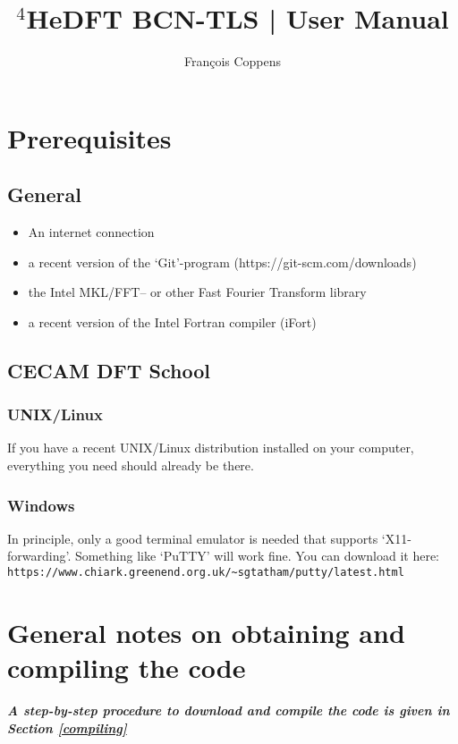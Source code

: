 \documentclass[10pt,a4paper]{article}
\author{Fran\c{c}ois Coppens}
\title{$^4$HeDFT BCN-TLS | User Manual }
\begin{document}
	\maketitle
	\tableofcontents
	\newpage
	\section{Prerequisites}
	\subsection{General}
	\begin{itemize}
		\item An internet connection
		\item a recent version of the `Git'-program (https://git-scm.com/downloads)
		\item the Intel MKL/FFT-- or other Fast Fourier Transform library
		\item a recent version of the Intel Fortran compiler (iFort)
	\end{itemize}

	\subsection{CECAM DFT School}
	\subsubsection{UNIX/Linux}
		If you have a recent UNIX/Linux distribution installed on your computer, everything you need should already be there.
	\subsubsection{Windows}
		In principle, only a good terminal emulator is needed that supports `X11-forwarding'. Something like `PuTTY' will work fine. You can download it here: {\color{lightblue}\verb|https://www.chiark.greenend.org.uk/~sgtatham/putty/latest.html|}

	\newpage
	\section{General notes on obtaining and compiling the code}
	
	{\color{red}\emph{\textbf{A step-by-step procedure to download and compile the code is given in Section \ref{compiling}}}}
	
\end{document}
